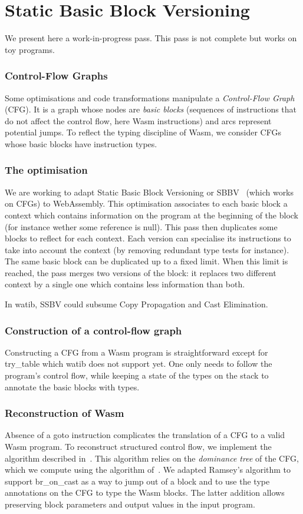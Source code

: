 \documentclass[a4paper,11pt]{article}
\begin{document}
\section{Static Basic Block Versioning}\label{sbbv}
We present here a work-in-progress pass. This pass is not complete but works on
toy programs.
\subsubsection{Control-Flow Graphs}\label{cfg}
Some optimisations and code transformations manipulate a \emph{Control-Flow
Graph} (CFG). It is a graph whose nodes are \emph{basic blocks} (sequences of
instructions that do not affect the control flow, here Wasm instructions) and
arcs represent potential jumps. To reflect the typing discipline of Wasm, we
consider CFGs whose basic blocks have instruction types.

\subsubsection{The optimisation}
We are working to adapt Static Basic Block Versioning or
SBBV~\cite{melanccon2024static} (which works on CFGs) to WebAssembly. This
optimisation associates to each basic block a context which contains information
on the program at the beginning of the block (for instance wether some reference
is null). This pass then duplicates some blocks to reflect for each context.
Each version can specialise its instructions to take into account the context
(by removing redundant type tests for instance). The same basic block can be
duplicated up to a fixed limit. When this limit is reached, the pass merges two
versions of the block: it replaces two different context by a single one which
contains less information than both.

In \textsf{watib}, SSBV could subsume Copy Propagation and Cast Elimination.

\subsubsection{Construction of a control-flow graph}
Constructing a CFG from a Wasm program is straightforward except for
\textsf{try\_table} which \textsf{watib} does not support yet. One only needs to
follow the program's control flow, while keeping a state of the types on the
stack to annotate the basic blocks with types.

\subsubsection{Reconstruction of Wasm}
Absence of a goto instruction complicates the translation of a CFG to a valid
Wasm program. To reconstruct structured control flow, we implement the algorithm
described in~\cite{ramsey2022beyond}. This algorithm relies on the
\emph{dominance tree} of the CFG, which we compute using the algorithm
of~\cite{cooper2001simple}. We adapted Ramsey's algorithm to support
\textsf{br\_on\_cast} as a way to jump out of a block and to use the type
annotations on the CFG to type the Wasm blocks. The latter addition allows
preserving block parameters and output values in the input program.
\end{document}
